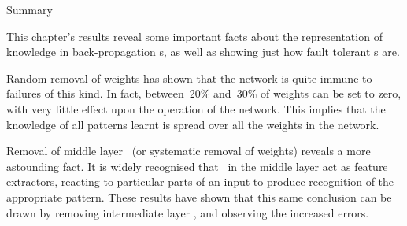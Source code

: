 \sec Summary

This chapter's results reveal some important facts about the
representation of knowledge in back-propagation \nn s, as well as
showing just how fault tolerant \nn s are.

Random removal of weights has shown that the network is quite immune
to failures of this kind.
In fact, between~20\% and~30\% of weights can be set to zero, with very
little effect upon the operation of the network.
This implies that the knowledge of all patterns learnt is spread
over all the weights in the network.

Removal of middle layer \neus\ (or systematic removal of weights)
reveals a more astounding fact.
It is widely recognised that \neus\ in the middle layer act as
feature extractors, reacting to particular parts of an input to
produce recognition of the appropriate pattern.
These results have shown that this same conclusion can be drawn by
removing intermediate layer \neus, and observing the increased
errors.


